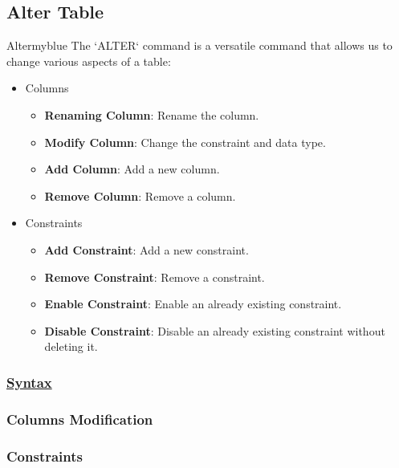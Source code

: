 \subsection{Alter Table}
\begin{prettyBox}{Alter}{myblue}
The `ALTER` command is a versatile command that allows us to change various aspects of a table:
\begin{itemize}
    \item Columns
        \begin{itemize}
            \item \textbf{Renaming Column}: Rename the column.
            \item \textbf{Modify Column}: Change the constraint and data type.
            \item \textbf{Add Column}: Add a new column.
            \item \textbf{Remove Column}: Remove a column.
        \end{itemize}
    \item Constraints
        \begin{itemize}
            \item \textbf{Add Constraint}: Add a new constraint. 
            \item \textbf{Remove Constraint}: Remove a constraint.
            \item \textbf{Enable Constraint}: Enable an already existing constraint.
            \item \textbf{Disable Constraint}: Disable an already existing constraint without deleting it.
        \end{itemize}
\end{itemize}
\end{prettyBox}

\subsubsection*{\underline{Syntax}}

\subsubsection*{Columns Modification}



\subsubsection*{Constraints}

